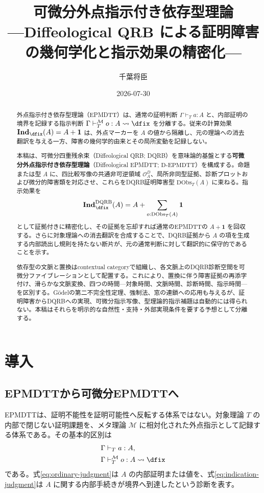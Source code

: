 \documentclass[a4paper,11pt]{ltjsarticle}
\title{可微分外点指示付き依存型理論\\
{\large ---Diffeological QRB による証明障害の幾何学化と指示効果の精密化---}}
\author{千葉将臣}
\date{2026-07-30}
\theoremstyle{definition}
\theoremstyle{plain}
\newcommand{\DEPMDTT}{\mathrm{D}\text{-}\mathrm{EPMDTT}}
\newcommand{\DQRB}{\mathrm{DQRB}}
\newcommand{\DObs}{\mathrm{DObs}}
\newcommand{\Meta}{\mathcal M}
\newcommand{\Unit}{\mathbf 1}
\newcommand{\Ind}{\mathbf{Ind}_{\dfix}}
\newcommand{\DInd}{\mathbf{Ind}^{\DQRB}_{\dfix}}
\begin{document}
\maketitle

\begin{abstract}
外点指示付き依存型理論（EPMDTT）は、通常の証明判断 $\Gamma\vdash_T a:A$ と、内部証明の境界を記録する指示判断 $\Gamma\vdash_T^{\Meta}o:A\rightsquigarrow\dfix$ を分離する。従来の計算効果 $\Ind(A)=A+\Unit$ は、外点マーカーを $A$ の値から隔離し、元の理論への消去翻訳を与える一方、障害の幾何学的由来とその局所変動を記録しない。

本稿は、可微分四重残余束（Diffeological QRB; DQRB）を意味論的基盤とする\textbf{可微分外点指示付き依存型理論}（Diffeological EPMDTT; $\DEPMDTT$）を構成する。命題または型 $A$ に、四比較写像の共通非可逆領域 $\mathcal O_A^D$、局所非同型証拠、診断プロットおよび微分的障害類を対応させ、これらをDQRB証明障害型 $\DObs_T(A)$ に束ねる。指示効果を
\[
 \DInd(A)=A+\sum_{o:\DObs_T(A)}\Unit
\]
として証拠付きに精密化し、その証拠を忘却すれば通常のEPMDTTの $A+\Unit$ を回収する。さらに対象理論への消去翻訳を合成することで、DQRB証拠から $A$ の項を生成する内部読出し規則を持たない断片が、元の通常判断に対して翻訳的に保守的であることを示す。

依存型の文脈と置換はcontextual categoryで組織し、各文脈上のDQRB診断空間を可微分ファイブレーションとして配置する。これにより、置換に伴う障害証拠の再添字付け、滑らかな文脈変換、四つの時間---対象時間、文脈時間、診断時間、指示時間---を区別する。Gödelの第二不完全性定理、強制法、窓の連鎖への応用も与えるが、証明障害からDQRBへの実現、可微分指示写像、型理論的指示補題は自動的には得られない。本稿はそれらを明示的な自然性・支持・外部実現条件を要する予想として分離する。
\end{abstract}

\tableofcontents

\section{導入}

\subsection{EPMDTTから可微分EPMDTTへ}

EPMDTTは、証明不能性を証明可能性へ反転する体系ではない。対象理論 $T$ の内部で閉じない証明課題を、メタ理論 $\Meta$ に相対化された外点指示として記録する体系である\cite{ChibaEPMDTT2026}。その基本的区別は
\begin{align}
 \Gamma&\vdash_T a:A,
 \label{eq:ordinary-judgment}\\
 \Gamma&\vdash_T^{\Meta}o:A\rightsquigarrow\dfix
 \label{eq:indication-judgment}
\end{align}
である。式\eqref{eq:ordinary-judgment}は $A$ の内部証明または値を、式\eqref{eq:indication-judgment}は $A$ に関する内部手続きが境界へ到達したという診断を表す。
\end{document}
